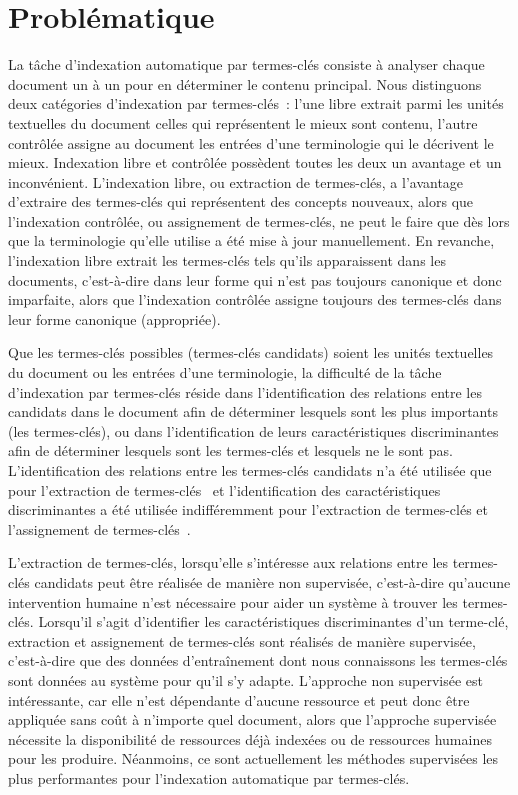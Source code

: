   \section{Problématique}
  \label{sec:main-introduction-problem_statement}
    La tâche d'indexation automatique par termes-clés consiste à analyser chaque
    document un à un pour en déterminer le contenu principal. Nous distinguons
    deux catégories d'indexation par termes-clés~: l'une libre extrait parmi les
    unités textuelles du document celles qui représentent le mieux sont contenu,
    l'autre contrôlée assigne au document les entrées d'une terminologie qui le
    décrivent le mieux. Indexation libre et contrôlée possèdent toutes les deux
    un avantage et un inconvénient. L'indexation libre, ou extraction de
    termes-clés, a l'avantage d'extraire des termes-clés qui représentent des
    concepts nouveaux, alors que l'indexation contrôlée, ou assignement de
    termes-clés, ne peut le faire que dès lors que la terminologie qu'elle
    utilise a été mise à jour manuellement. En revanche, l'indexation libre
    extrait les termes-clés tels qu'ils apparaissent dans les documents,
    c'est-à-dire dans leur forme qui n'est pas toujours canonique et donc
    imparfaite, alors que l'indexation contrôlée assigne toujours des
    termes-clés dans leur forme canonique (appropriée).
    
    Que les termes-clés possibles (termes-clés candidats) soient les unités textuelles du
    document ou les entrées d'une terminologie, la difficulté de la tâche
    d'indexation par termes-clés réside dans l'identification des relations
    entre les candidats dans le document afin de déterminer lesquels sont les
    plus importants (les termes-clés), ou dans l'identification de leurs
    caractéristiques discriminantes afin de déterminer lesquels sont les
    termes-clés et lesquels ne le sont pas. L'identification des relations entre
    les termes-clés candidats n'a été utilisée que pour l'extraction de
    termes-clés~\cite{mihalcea2004textrank} et l'identification des
    caractéristiques discriminantes a été utilisée indifféremment pour
    l'extraction de termes-clés et l'assignement de
    termes-clés~\cite{witten1999kea,medelyan2006kea++}.

    L'extraction de termes-clés, lorsqu'elle s'intéresse aux relations entre les
    termes-clés candidats peut être réalisée de manière non supervisée,
    c'est-à-dire qu'aucune intervention humaine n'est nécessaire pour aider un
    système à trouver les termes-clés. Lorsqu'il s'agit d'identifier les
    caractéristiques discriminantes d'un terme-clé, extraction et assignement de
    termes-clés sont réalisés de manière supervisée, c'est-à-dire que des
    données d'entraînement dont nous connaissons les termes-clés sont données au
    système pour qu'il s'y adapte. L'approche non supervisée est intéressante,
    car elle n'est dépendante d'aucune ressource et peut donc être appliquée
    sans coût à n'importe quel document, alors que l'approche supervisée
    nécessite la disponibilité de ressources déjà indexées ou de ressources
    humaines pour les produire. Néanmoins, ce sont actuellement les méthodes
    supervisées les plus performantes pour l'indexation automatique par
    termes-clés.

